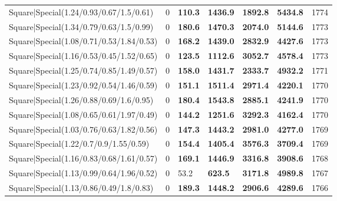 \begin{tabular}{lrllllr}
 Square|Special(1.24/0.93/0.67/1.5/0.61)                       &             0   & \textbf{110.3} & \textbf{1436.9} & \textbf{1892.8} & \textbf{5434.8} &         1774 \\
 Square|Special(1.34/0.79/0.63/1.5/0.99)                       &             0   & \textbf{180.6} & \textbf{1470.3} & \textbf{2074.0} & \textbf{5144.6} &         1773 \\
 Square|Special(1.08/0.71/0.53/1.84/0.53)                      &             0   & \textbf{168.2} & \textbf{1439.0} & \textbf{2832.9} & \textbf{4427.6} &         1773 \\
 Square|Special(1.16/0.53/0.45/1.52/0.65)                      &             0   & \textbf{123.5} & \textbf{1112.6} & \textbf{3052.7} & \textbf{4578.4} &         1773 \\
 Square|Special(1.25/0.74/0.85/1.49/0.57)                      &             0   & \textbf{158.0} & \textbf{1431.7} & \textbf{2333.7} & \textbf{4932.2} &         1771 \\
 Square|Special(1.23/0.92/0.54/1.46/0.59)                      &             0   & \textbf{151.1} & \textbf{1511.4} & \textbf{2971.4} & \textbf{4220.1} &         1770 \\
 Square|Special(1.26/0.88/0.69/1.6/0.95)                       &             0   & \textbf{180.4} & \textbf{1543.8} & \textbf{2885.1} & \textbf{4241.9} &         1770 \\
 Square|Special(1.08/0.65/0.61/1.97/0.49)                      &             0   & \textbf{144.2} & \textbf{1251.6} & \textbf{3292.3} & \textbf{4162.4} &         1770 \\
 Square|Special(1.03/0.76/0.63/1.82/0.56)                      &             0   & \textbf{147.3} & \textbf{1443.2} & \textbf{2981.0} & \textbf{4277.0} &         1769 \\
 Square|Special(1.22/0.7/0.9/1.55/0.59)                        &             0   & \textbf{154.4} & \textbf{1405.4} & \textbf{3576.3} & \textbf{3709.4} &         1769 \\
 Square|Special(1.16/0.83/0.68/1.61/0.57)                      &             0   & \textbf{169.1} & \textbf{1446.9} & \textbf{3316.8} & \textbf{3908.6} &         1768 \\
 Square|Special(1.13/0.99/0.64/1.96/0.52)                      &             0   & 53.2           & \textbf{623.5}  & \textbf{3171.8} & \textbf{4989.8} &         1767 \\
 Square|Special(1.13/0.86/0.49/1.8/0.83)                       &             0   & \textbf{189.3} & \textbf{1448.2} & \textbf{2906.6} & \textbf{4289.6} &         1766 \\

\end{tabular}
